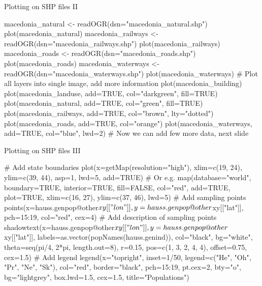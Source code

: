 \documentclass[compress, ucs, xelatex, 11pt, xcolor=svgnames, aspectratio=169,
	hyperref={
		bookmarks=true,
		unicode=true,
		colorlinks=true,
		pdftitle={Molecular data in R},
		plainpages=false,
		pdfauthor={Vojtech Zeisek},
		pdfsubject={Course about phylogeny and evolution in R},
		pdfcreator={XeLaTeX},
		pdfkeywords={R, evolution, phylogeny, molecular data},
		linkcolor=Crimson, %
		anchorcolor=Magenta, %
		citecolor=Magenta, %
		filecolor=Magenta, %
		menucolor=Magenta, %
		urlcolor=DodgerBlue, %
		pdftex},
	url={hyphens, lowtilde} %
	]{beamer}
\begin{document}
\begin{frame}[fragile]{Plotting on SHP files II}
	\begin{spluscode}
    macedonia_natural <- readOGR(dsn="macedonia_natural.shp")
    plot(macedonia_natural)
    macedonia_railways <- readOGR(dsn="macedonia_railways.shp")
    plot(macedonia_railways)
    macedonia_roads <- readOGR(dsn="macedonia_roads.shp")
    plot(macedonia_roads)
    macedonia_waterways <- readOGR(dsn="macedonia_waterways.shp")
    plot(macedonia_waterways)
    # Plot all layers into single image, add more information
    plot(macedonia_building)
    plot(macedonia_landuse, add=TRUE, col="darkgreen", fill=TRUE)
    plot(macedonia_natural, add=TRUE, col="green", fill=TRUE)
    plot(macedonia_railways, add=TRUE, col="brown", lty="dotted")
    plot(macedonia_roads, add=TRUE, col="orange")
    plot(macedonia_waterways, add=TRUE, col="blue", lwd=2)
    # Now we can add few more data, next slide
	\end{spluscode}
\end{frame}

\begin{frame}[fragile]{Plotting on SHP files III}
	\begin{spluscode}
    # Add state boundaries
    plot(x=getMap(resolution="high"), xlim=c(19, 24), ylim=c(39, 44), asp=1,
      lwd=5, add=TRUE) # Or e.g.
    map(database="world", boundary=TRUE, interior=TRUE, fill=FALSE,
      col="red", add=TRUE, plot=TRUE, xlim=c(16, 27), ylim=c(37, 46), lwd=5)
    # Add sampling points
    points(x=hauss.genpop@other$xy[["lon"]],
      y=hauss.genpop@other$xy[["lat"]], pch=15:19, col="red", cex=4)
    # Add description of sampling points
    shadowtext(x=hauss.genpop@other$xy[["lon"]], y=hauss.genpop@other$
      xy[["lat"]], labels=as.vector(popNames(hauss.genind)), col="black",
      bg="white", theta=seq(pi/4, 2*pi, length.out=8), r=0.15,
      pos=c(1, 3, 2, 4, 4), offset=0.75, cex=1.5)
    # Add legend
    legend(x="topright", inset=1/50, legend=c("He", "Oh", "Pr", "Ne", "Sk"),
      col="red", border="black", pch=15:19, pt.cex=2, bty="o",
      bg="lightgrey", box.lwd=1.5, cex=1.5, title="Populations")
	\end{spluscode}
\end{frame}
\end{document}
